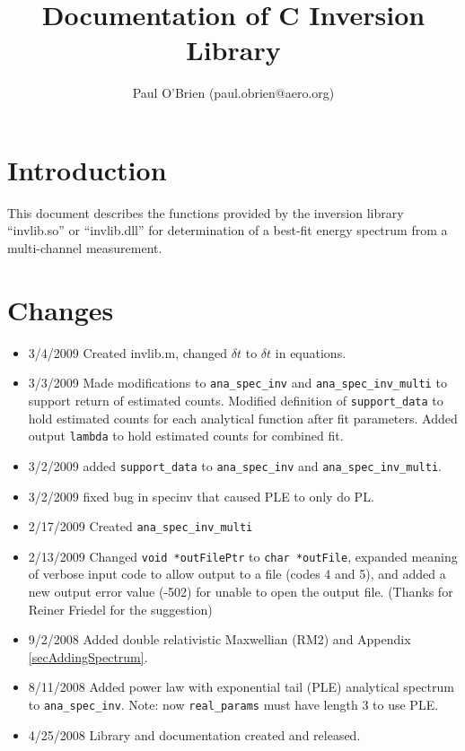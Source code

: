 \documentclass{article}    %
\title{Documentation of C Inversion Library}
\author{Paul O'Brien (paul.obrien@aero.org)}         %
\begin{document}

\maketitle                 %

\tableofcontents

\section{Introduction}

This document describes the functions provided by the inversion
library ``invlib.so'' or ``invlib.dll'' for determination of a
best-fit energy spectrum from a multi-channel measurement.

\section{Changes}
\label{secChanges}

\begin{itemize}
\item{3/4/2009} Created invlib.m, changed $\delta t$ to $\delta t$ in equations.
\item{3/3/2009} Made modifications to \verb|ana_spec_inv| and \verb|ana_spec_inv_multi| to support return of estimated counts.
\subitem Modified definition of \verb|support_data| to hold estimated counts for each analytical function after fit parameters.
\subitem Added output \verb|lambda| to hold estimated counts for combined fit.
\item{3/2/2009} added \verb|support_data| to \verb|ana_spec_inv| and \verb|ana_spec_inv_multi|.
\item{3/2/2009} fixed bug in specinv that caused PLE to only do PL.
\item{2/17/2009} Created \verb|ana_spec_inv_multi|
\item{2/13/2009} Changed \verb|void *outFilePtr| to \verb|char *outFile|, 
  expanded meaning of verbose input code to allow output to a file (codes 4 and 5), 
  and added a new output error value (-502) for unable to open the output file. 
  (Thanks for Reiner Friedel for the suggestion)
\item{9/2/2008} Added double relativistic Maxwellian (RM2) and Appendix \ref{secAddingSpectrum}.
\item{8/11/2008} Added power law with exponential tail (PLE)
  analytical spectrum to \verb|ana_spec_inv|. Note: now
  \verb|real_params| must have length 3 to use PLE.
\item{4/25/2008} Library and documentation created and released.
\end{itemize}
\end{document}
